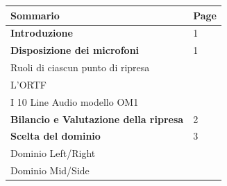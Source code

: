 \newcommand{\mylanguages}{italian} %
\newcommand{\mytitle}{Totalità sonora: il corpo dell'orchestra}
\newcommand{\mysubtitle}{Per ascoltare l'organismo sonoro orchestrale nel suo complesso e nei singoli dettagli}
\newcommand{\authorone}{Giancarlo Bottalico}
\newcommand{\institutione}{Conservatorio di musica "N. Piccinni", Bari}
\newcommand{\emailone}{giancarlobottalico@gmail.com}


\maketitle
\thispagestyle{empty}

\begin{table}[htp]
	\begin{tabular}{ll}
		\textbf{Sommario} & \textbf{Page} \\
		\hline
		\textbf{Introduzione} & 1 \\
		\hline
		\textbf{Disposizione dei microfoni} & 1 \\
		Ruoli di ciascun punto di ripresa & \\
		L'ORTF & \\
		I 10 Line Audio modello OM1 & \\
		\hline
		\textbf{Bilancio e Valutazione della ripresa} & 2 \\
		\hline
		\textbf{Scelta del dominio} & 3 \\
		Dominio Left/Right & \\
		Dominio Mid/Side & \\
		
	\end{tabular}
\end{table}

